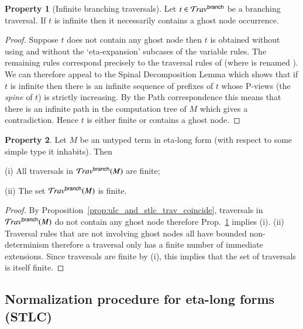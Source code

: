 \documentclass{elsarticle}
\theoremstyle{plain}
\theoremstyle{definition}
\newtheorem{property}{Property}[section]
\theoremstyle{remark}
\newcommand{\ghostlmd}{{\lambda\!\!\lambda}}
\newcommand{\branching}{{\sf branch}}
\newcommand{\travsetbr}{{\travset^\branching}}
\begin{document}
\begin{property}[Infinite branching traversals]
\label{prop:branching_spine_property}
Let $t\in \travsetbr$ be a branching traversal. If $t$ is infinite then it necessarily contains a ghost node occurrence.
\end{property}
\begin{proof}
Suppose $t$ does not contain any ghost node then
$t$ is obtained without using \rulenamet{Lam^\ghostlmd_\branching} and without the `eta-expansion' subcases of the variable rules. The remaining rules correspond precisely to the traversal rules of
\cite{Ong2006} (where  is renamed ).
We can therefore appeal to the Spinal Decomposition Lemma
\cite[Lemma 14]{Ong2006} which shows that if $t$ is infinite then there is an infinite sequence of prefixes of $t$ whose P-views (the \emph{spine} of $t$) is strictly increasing. By the Path correspondence this means that there is an infinite path in the computation tree of $M$ which gives a contradiction. Hence $t$ is either finite or contains a ghost node.
\end{proof}

\begin{property}
\label{prop:etalong_trav_finite}
Let $M$ be an untyped term in eta-long form (with respect to some simple type it inhabits). Then
\begin{enumerate*}
\item[(i)] All traversals in $\travsetbr(M)$ are finite;
\item[(ii)] The set $\travsetbr(M)$ is finite.
\end{enumerate*}
\end{property}
\begin{proof}
By Proposition~\ref{prop:ulc_and_stlc_trav_coincide}, traversals in $\travsetbr(M)$ do not contain any ghost node therefore Prop.~\ref{prop:branching_spine_property} implies (i).
(ii) Traversal rules that are not involving ghost nodes all have bounded non-determinism therefore a traversal only has a finite number of immediate extensions. Since traversals are finite by (i), this implies that the set of traversals is itself finite.
\end{proof}


\subsection{Normalization procedure for eta-long forms (STLC)}
\end{document}
